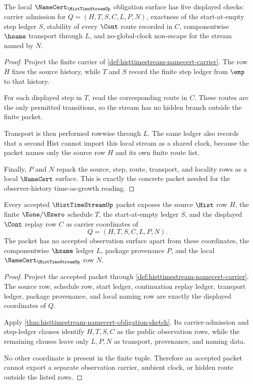 \begin{theorem}
\label{thm:histtimestream-namecert-obligation-sketch}
The local $\NameCert_{\HistTimeStreamUp}$ obligation surface has five displayed
checks: carrier admission for $Q=(H,T,S,C,L,P,N)$, exactness of the
start-at-empty step ledger $S$, stability of every $\Cont$ route recorded in
$C$, componentwise $\hsame$ transport through $L$, and no-global-clock
non-escape for the stream named by $N$.
\end{theorem}
\begin{proof}
Project the finite carrier of
\autoref{def:histtimestream-namecert-carrier}. The row $H$ fixes the source
history, while $T$ and $S$ record the finite step ledger from $\emp$ to that
history.

For each displayed step in $T$, read the corresponding route in $C$. These
routes are the only permitted transitions, so the stream has no hidden branch
outside the finite packet.

Transport is then performed rowwise through $L$. The same ledger also records
that a second Hist cannot import this local stream as a shared clock, because
the packet names only the source row $H$ and its own finite route list.

Finally, $P$ and $N$ repack the source, step, route, transport, and locality
rows as a local $\NameCert$ surface. This is exactly the concrete packet needed
for the observer-history time-as-growth reading.
\end{proof}

\begin{theorem}
\label{thm:histtimestream-observation-carrier}
Every accepted $\HistTimeStreamUp$ packet exposes the source $\Hist$ row $H$, the finite $\Eone/\Ezero$ schedule $T$, the start-at-empty ledger $S$, and the displayed $\Cont$ replay row $C$ as carrier coordinates of
$$
Q=(H,T,S,C,L,P,N).
$$
The packet has no accepted observation surface apart from these coordinates, the componentwise $\hsame$ ledger $L$, package provenance $P$, and the local $\NameCert_{\HistTimeStreamUp}$ row $N$.
\end{theorem}
\begin{proof}
Project the accepted packet through \autoref{def:histtimestream-namecert-carrier}. The source row, schedule row, start ledger, continuation replay ledger, transport ledger, package provenance, and local naming row are exactly the displayed coordinates of $Q$.

Apply \autoref{thm:histtimestream-namecert-obligation-sketch}. Its carrier-admission and step-ledger clauses identify $H,T,S,C$ as the public observation rows, while the remaining clauses leave only $L,P,N$ as transport, provenance, and naming data.

No other coordinate is present in the finite tuple. Therefore an accepted packet cannot export a separate observation carrier, ambient clock, or hidden route outside the listed rows.
\end{proof}

